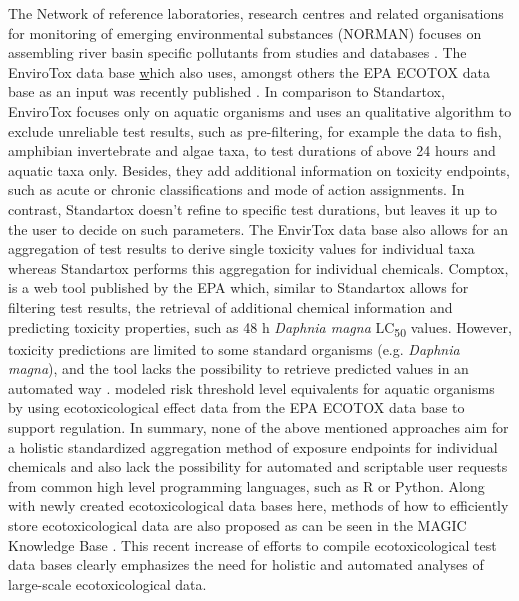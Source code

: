 The Network of reference laboratories, research centres and related organisations for monitoring of emerging environmental substances (NORMAN) focuses on assembling river basin specific pollutants from studies and databases \citep{von_der_ohe_new_2011}. The EnviroTox data base \href{https://envirotoxdatabase.org/} which also uses, amongst others the EPA ECOTOX data base as an input was recently published \citep{healthandenvironmentalsciencesinstitutehesi_envirotox_2019, connors_creation_2019}. In comparison to Standartox, EnviroTox focuses only on aquatic organisms and uses an qualitative algorithm to exclude unreliable test results, such as pre-filtering, for example the data to fish, amphibian invertebrate and algae taxa, to test durations of above 24 hours and aquatic taxa only. Besides, they add additional information on toxicity endpoints, such as acute or chronic classifications and mode of action assignments. In contrast, Standartox doesn't refine to specific test durations, but leaves it up to the user to decide on such parameters. The EnvirTox data base also allows for an aggregation of test results to derive single toxicity values for individual taxa whereas Standartox performs this aggregation for individual chemicals. Comptox, is a web tool published by the EPA which, similar to Standartox allows for filtering test results, the retrieval of additional chemical information and predicting toxicity properties, such as 48 h \textit{Daphnia magna} LC\textsubscript{50} values. However, toxicity predictions are limited to some standard organisms (e.g. \textit{Daphnia magna}), and the tool lacks the possibility to retrieve predicted values in an automated way \citep{williams_comptox_2017}. \citet{petschick_modeling_2019} modeled risk threshold level equivalents for aquatic organisms by using ecotoxicological effect data from the EPA ECOTOX data base to support regulation. In summary, none of the above mentioned approaches aim for a holistic standardized aggregation method of exposure endpoints for individual chemicals and also lack the possibility for automated and scriptable user requests from common high level programming languages, such as R or Python. Along with newly created ecotoxicological data bases here, methods of how to efficiently store ecotoxicological data are also proposed as can be seen in the MAGIC Knowledge Base \citep{bub_graphing_2019}. This recent increase of efforts to compile ecotoxicological test data bases clearly emphasizes the need for holistic and automated analyses of large-scale ecotoxicological data. 

